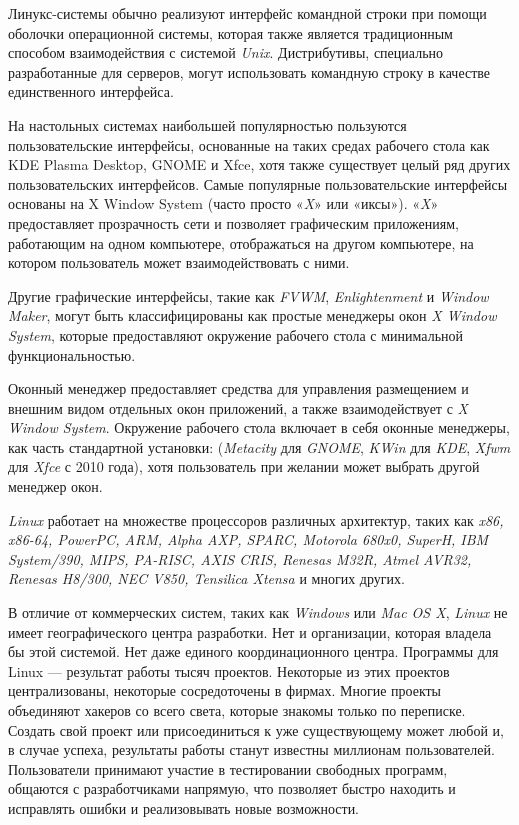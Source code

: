 Линукс-системы обычно реализуют интерфейс командной строки при помощи оболочки операционной системы, которая также является традиционным способом взаимодействия с системой \textit{Unix}. Дистрибутивы, специально разработанные для серверов, могут использовать командную строку в качестве единственного интерфейса.

На настольных системах наибольшей популярностью пользуются пользовательские интерфейсы, основанные на таких средах рабочего стола как KDE Plasma Desktop, GNOME и Xfce, хотя также существует целый ряд других пользовательских интерфейсов. Самые популярные пользовательские интерфейсы основаны на X Window System (часто просто «\textit{X}» или «иксы»). «\textit{X}» предоставляет прозрачность сети и позволяет графическим приложениям, работающим на одном компьютере, отображаться на другом компьютере, на котором пользователь может взаимодействовать с ними.

Другие графические интерфейсы, такие как \textit{FVWM}, \textit{Enlightenment} и \textit{Window Maker}, могут быть классифицированы как простые менеджеры окон \textit{X Window System}, которые предоставляют окружение рабочего стола с минимальной функциональностью.

Оконный менеджер предоставляет средства для управления размещением и внешним видом отдельных окон приложений, а также взаимодействует с \textit{X Window System}. Окружение рабочего стола включает в себя оконные менеджеры, как часть стандартной установки: (\textit{Metacity} для \textit{GNOME}, \textit{\textit{KWin}} для \textit{KDE}, \textit{Xfwm} для \textit{Xfce} с 2010 года), хотя пользователь при желании может выбрать другой менеджер окон.

\textit{Linux} работает на множестве процессоров различных архитектур, таких как \textit{x86, x86-64, PowerPC, ARM, Alpha AXP, SPARC, Motorola 680x0, SuperH, IBM System/390, MIPS, PA-RISC, AXIS CRIS, Renesas M32R, Atmel AVR32, Renesas H8/300, NEC V850, Tensilica Xtensa} и многих других.

В отличие от коммерческих систем, таких как \textit{Windows} или \textit{Mac OS X}, \textit{Linux} не имеет географического центра разработки. Нет и организации, которая владела бы этой системой. Нет даже единого координационного центра. Программы для Linux — результат работы тысяч проектов. Некоторые из этих проектов централизованы, некоторые сосредоточены в фирмах. Многие проекты объединяют хакеров со всего света, которые знакомы только по переписке. Создать свой проект или присоединиться к уже существующему может любой и, в случае успеха, результаты работы станут известны миллионам пользователей. Пользователи принимают участие в тестировании свободных программ, общаются с разработчиками напрямую, что позволяет быстро находить и исправлять ошибки и реализовывать новые возможности.